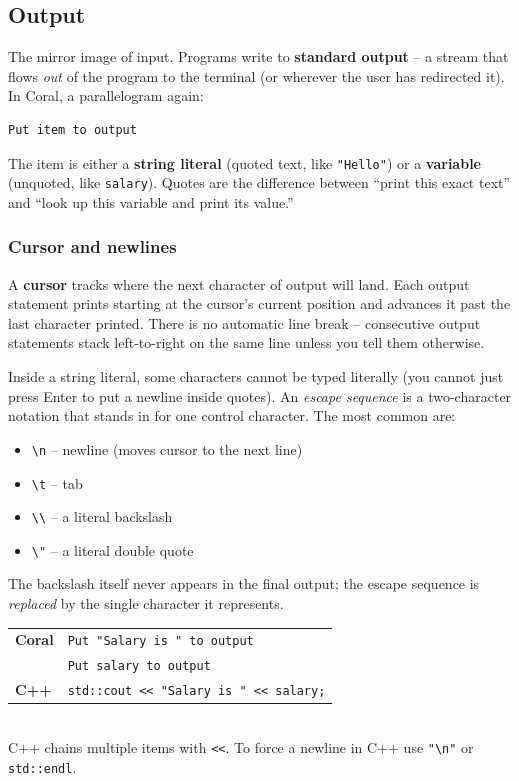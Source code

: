 \documentclass[11pt]{article}
\begin{document}
\subsection{Output}

The mirror image of input. Programs write to \textbf{standard output} --
a stream that flows \emph{out} of the program to the terminal (or wherever
the user has redirected it). In Coral, a parallelogram again:
\begin{lstlisting}
Put item to output
\end{lstlisting}
The item is either a \textbf{string literal} (quoted text, like
\texttt{"Hello"}) or a \textbf{variable} (unquoted, like \texttt{salary}).
Quotes are the difference between ``print this exact text'' and ``look up
this variable and print its value.''

\subsubsection{Cursor and newlines}

A \textbf{cursor} tracks where the next character of output will land. Each
output statement prints starting at the cursor's current position and
advances it past the last character printed. There is no automatic line
break -- consecutive output statements stack left-to-right on the same line
unless you tell them otherwise.

\begin{defnbox}
Inside a string literal, some characters cannot be typed literally (you
cannot just press Enter to put a newline inside quotes). An \emph{escape
sequence} is a two-character notation that stands in for one control
character. The most common are:
\begin{itemize}
    \item \texttt{\textbackslash n} -- newline (moves cursor to the next line)
    \item \texttt{\textbackslash t} -- tab
    \item \texttt{\textbackslash\textbackslash} -- a literal backslash
    \item \texttt{\textbackslash"} -- a literal double quote
\end{itemize}
The backslash itself never appears in the final output; the escape sequence
is \emph{replaced} by the single character it represents.
\end{defnbox}

\begin{examplebox}
\begin{tabular}{ll}
\textbf{Coral} & \texttt{Put "Salary is " to output} \\
               & \texttt{Put salary to output} \\
\textbf{C++}   & \texttt{std::cout << "Salary is " << salary;} \\
\end{tabular}\\[4pt]
C++ chains multiple items with \texttt{<<}. To force a newline in C++ use
\texttt{"\textbackslash n"} or \texttt{std::endl}.
\end{examplebox}
\end{document}
